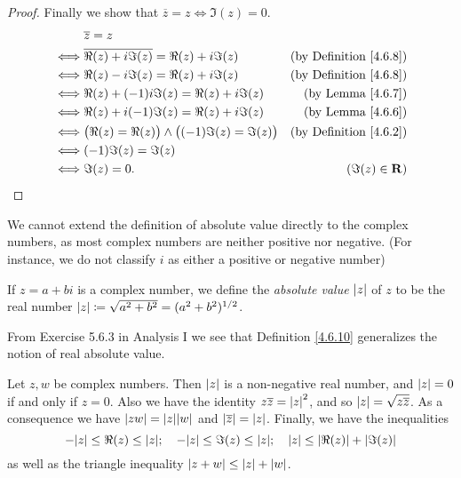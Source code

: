 \begin{proof}
    Finally we show that \(\overline{z} = z \iff \Im(z) = 0\).
    \begin{align*}
             & \overline{z} = z                                                                                    \\
        \iff & \overline{\Re(z) + i \Im(z)} = \Re(z) + i \Im(z)               & \text{(by Definition \ref{4.6.8})} \\
        \iff & \Re(z) - i \Im(z) = \Re(z) + i \Im(z)                          & \text{(by Definition \ref{4.6.8})} \\
        \iff & \Re(z) + (-1) i \Im(z) = \Re(z) + i \Im(z)                     & \text{(by Lemma \ref{4.6.7})}      \\
        \iff & \Re(z) + i (-1) \Im(z) = \Re(z) + i \Im(z)                     & \text{(by Lemma \ref{4.6.6})}      \\
        \iff & \big(\Re(z) = \Re(z)\big) \land \big((-1) \Im(z) = \Im(z)\big) & \text{(by Definition \ref{4.6.2})} \\
        \iff & (-1) \Im(z) = \Im(z)                                                                                \\
        \iff & \Im(z) = 0.                                                    & (\Im(z) \in \mathbf{R})
    \end{align*}
\end{proof}

\begin{note}
    We cannot extend the definition of absolute value directly to the complex numbers, as most complex numbers are neither positive nor negative.
    (For instance, we do not classify \(i\) as either a positive or negative number)
\end{note}

\begin{definition}\label{4.6.10}
    If \(z = a + bi\) is a complex number, we define the \emph{absolute value} \(\abs*{z}\) of \(z\) to be the real number \(\abs*{z} \coloneqq \sqrt{a^2 + b^2} = (a^2 + b^2)^{1 / 2}\).
\end{definition}

\begin{note}
    From Exercise 5.6.3 in Analysis I we see that Definition \ref{4.6.10} generalizes the notion of real absolute value.
\end{note}

\begin{lemma}\label{4.6.11}
    Let \(z, w\) be complex numbers.
    Then \(\abs*{z}\) is a non-negative real number, and \(\abs*{z} = 0\) if and only if \(z = 0\).
    Also we have the identity \(z \overline{z} = \abs*{z}^2\), and so \(\abs*{z} = \sqrt{z \overline{z}}\).
    As a consequence we have \(\abs*{zw} = \abs*{z} \abs*{w}\) and \(\abs*{\overline{z}} = \abs*{z}\).
    Finally, we have the inequalities
    \[
        -\abs*{z} \leq \Re(z) \leq \abs*{z}; \quad -\abs*{z} \leq \Im(z) \leq \abs*{z}; \quad \abs*{z} \leq \abs*{\Re(z)} + \abs*{\Im(z)}
    \]
    as well as the triangle inequality \(\abs*{z + w} \leq \abs*{z} + \abs*{w}\).
\end{lemma}


